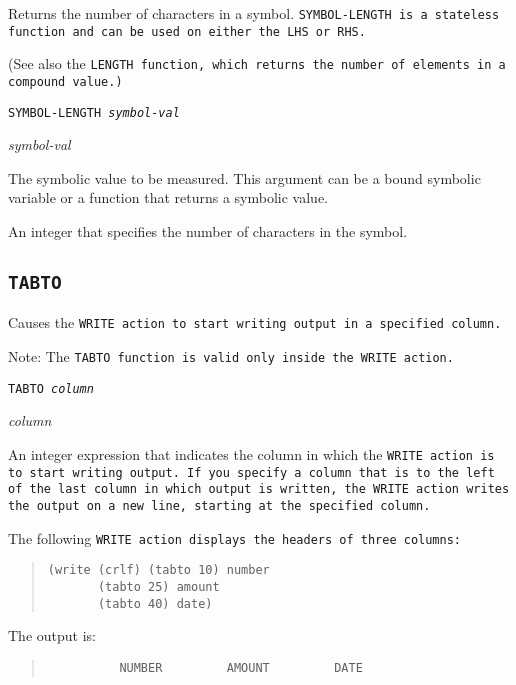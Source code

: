 {{Returns the number of characters in a symbol. \tt{SYMBOL-LENGTH} is a
stateless function and can be used on either the LHS or RHS.

(See also the \tt{LENGTH} function, which returns the number of
elements in a compound value.)

\Format

\tt{SYMBOL-LENGTH} \it{symbol-val}

\Argument

\it{symbol-val}

The symbolic value to be measured. This argument can be a
bound symbolic variable or a function that returns a symbolic
value.

\ReturnValue

An integer that specifies the number of characters in the
symbol.

\subsection{\tt{TABTO}}

Causes the \tt{WRITE} action to start writing output in a specified
column.

Note: The \tt{TABTO} function is valid only inside the \tt{WRITE}
action.

\Format

\tt{TABTO} \it{column}

\Argument

\it{column}

An integer expression that indicates the column in which the
\tt{WRITE} action is to start writing output. If you specify a column
that is to the left of the last column in which output is written, the
\tt{WRITE} action writes the output on a new line, starting at the
specified column.

\Example

The following \tt{WRITE} action displays the headers of three
columns:
\begin{quote}
\begin{verbatim}
(write (crlf) (tabto 10) number
       (tabto 25) amount
       (tabto 40) date)
\end{verbatim}
\end{quote}
     
The output is:
\begin{quote}
\begin{verbatim}
          NUMBER         AMOUNT         DATE
\end{verbatim}
\end{quote}

}}
